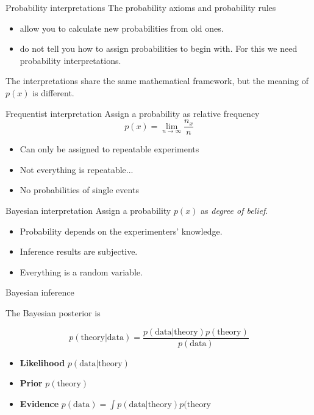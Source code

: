 \documentclass[
aspectratio=169,
14pt,
professionalfonts
]{beamer}
\begin{document}
\begin{frame}{Probability interpretations}
    The probability axioms and probability rules
    \begin{itemize}
        \item allow you to calculate new probabilities from old ones.
        \item do not tell you how to assign probabilities to begin with. For this we need probability interpretations.
    \end{itemize}

    The interpretations share the same mathematical framework, but the meaning of $p(x)$ is different.
\end{frame}

\begin{frame}{Frequentist interpretation}
Assign a probability as relative frequency
$$
p(x) = \lim_{n\to\infty} \frac{n_x}{n}
$$

\begin{itemize}
    \item Can only be assigned to repeatable experiments
    \item Not everything is repeatable...
    \item No probabilities of single events
\end{itemize}
\end{frame}

\begin{frame}{Bayesian interpretation}
Assign a probability $p(x)$ as \textit{degree of belief}.

\begin{itemize}
    \item Probability depends on the experimenters' knowledge.
    \item Inference results are subjective.
    \item Everything is a random variable.
\end{itemize}
\end{frame}

\begin{frame}{Bayesian inference}

The Bayesian posterior is

$$p(\text{theory} | \text{data}) = \frac{p(\text{data}|\text{theory}) p(\text{theory})}{p(\text{data})}$$

\begin{itemize}
    \item \textbf{Likelihood} $p(\text{data}|\text{theory})$
    \item \textbf{Prior} $p(\text{theory})$
    \item \textbf{Evidence} $p(\text{data}) = \int p(\text{data}|\text{theory}) p(\text{theory}$
\end{itemize}
\end{frame}
\end{document}
